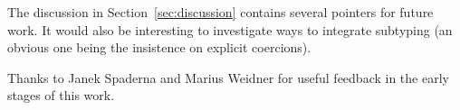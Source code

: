 \documentclass[acmsmall,screen]{acmart}
\begin{document}
The discussion in Section~\ref{sec:discussion} contains several
pointers for future work. It would also be interesting to investigate
ways to integrate subtyping (an obvious one being the insistence on
explicit coercions).

\begin{acks}
  Thanks to Janek Spaderna and Marius Weidner for useful feedback in
  the early stages of this work.
\end{acks}





\end{document}
